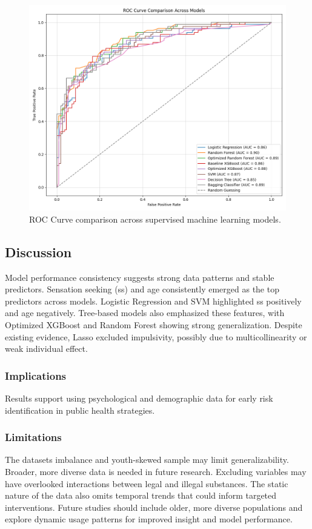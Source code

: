 \documentclass{article}
\begin{document}
\begin{figure}[h!]
    \centering
    \includegraphics[width=\textwidth]{Figure_1.png}
    \caption{ROC Curve comparison across supervised machine learning models.}
    \label{fig:ROC}
\end{figure}

\subsection*{Discussion}

Model performance consistency suggests strong data patterns and stable predictors. Sensation seeking (ss) and age consistently emerged as the top predictors across models. Logistic Regression and SVM highlighted ss positively and age negatively. Tree-based models also emphasized these features, with Optimized XGBoost and Random Forest showing strong generalization. Despite existing evidence, Lasso excluded impulsivity, possibly due to multicollinearity or weak individual effect.

\subsubsection*{Implications}
Results support using psychological and demographic data for early risk identification in public health strategies.

\subsubsection*{Limitations}
The datasets imbalance and youth-skewed sample may limit generalizability. Broader, more diverse data is needed in future research. Excluding variables may have overlooked interactions between legal and illegal substances. The static nature of the data also omits temporal trends that could inform targeted interventions. Future studies should include older, more diverse populations and explore dynamic usage patterns for improved insight and model performance.
\end{document}
